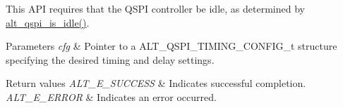 This A\+PI requires that the Q\+S\+PI controller be idle, as determined by \mbox{\hyperlink{group__ALT__QSPI__CSR_gaeaa7e762d8b79b1989385c978174b7b8}{alt\+\_\+qspi\+\_\+is\+\_\+idle()}}.


\begin{DoxyParams}{Parameters}
{\em cfg} & Pointer to a A\+L\+T\+\_\+\+Q\+S\+P\+I\+\_\+\+T\+I\+M\+I\+N\+G\+\_\+\+C\+O\+N\+F\+I\+G\+\_\+t structure specifying the desired timing and delay settings.\\
\hline
\end{DoxyParams}

\begin{DoxyRetVals}{Return values}
{\em A\+L\+T\+\_\+\+E\+\_\+\+S\+U\+C\+C\+E\+SS} & Indicates successful completion. \\
\hline
{\em A\+L\+T\+\_\+\+E\+\_\+\+E\+R\+R\+OR} & Indicates an error occurred. \\
\hline
\end{DoxyRetVals}
